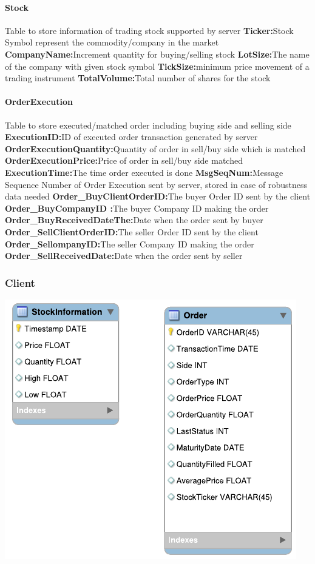 \documentclass[a4paper, 11pt]{article}
\begin{document}
\paragraph*{Stock}
Table to store information of trading stock supported by server
\textbf{Ticker:}Stock Symbol represent the commodity/company in the market
\textbf{CompanyName:}Increment quantity for buying/selling stock
\textbf{LotSize:}The name of the company with given stock symbol
\textbf{TickSize:}minimum price movement of a trading instrument
\textbf{TotalVolume:}Total number of shares for the stock
 	 
\paragraph*{OrderExecution}
Table to store executed/matched order including buying side and selling side
\textbf{ExecutionID:}ID of executed order transaction generated by server
\textbf{OrderExecutionQuantity:}Quantity of order in sell/buy side which is matched
\textbf{OrderExecutionPrice:}Price of order in sell/buy side matched
\textbf{ExecutionTime:}The time order executed is done
\textbf{MsgSeqNum:}Message Sequence Number of Order Execution sent by server, stored in case of robustness data needed	
\textbf{Order\_BuyClientOrderID:}The buyer Order ID sent by the client 
\textbf{Order\_BuyCompanyID :}The buyer Company ID making the order	
\textbf{Order\_BuyReceivedDateThe:}Date when the order sent by buyer 
\textbf{Order\_SellClientOrderID:}The seller Order ID sent by the client
\textbf{Order\_SellompanyID:}The seller Company ID making the order
\textbf{Order\_SellReceivedDate:}Date when the order sent by seller 

\subsubsection*{Client}
\includegraphics{../diagrams/client_database.pdf}
\end{document}
